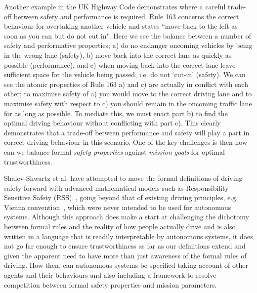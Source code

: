 \documentclass[sigconf]{acmart}
\begin{document}
Another example in the UK Highway Code demonstrates where a careful trade-off between safety and performance is required. 
%
Rule 163 concerns the correct behaviour for overtaking another vehicle and states ``move back to the left as soon as you can but do not cut in". 
%
Here we see the balance between a number of safety and performative properties; a) do no endanger oncoming vehicles by being in the wrong lane (safety), b) move back into the correct lane as quickly as possible (performance), and c) when moving back into the correct lane leave sufficient space for the vehicle being passed, i.e. do not `cut-in' (safety). 
%
We can see the atomic properties of Rule 163 a) and c) are actually in conflict with each other; 
%
to maximise safety of a) you would move to the correct driving lane and to maximise safety with respect to c) you should remain in the oncoming traffic lane for as long as possible. 
%
To mediate this, we must enact part b) to find the optimal driving behaviour without conflicting with part c). 
%
This clearly demonstrates that a trade-off between performance and safety will play a part in correct driving behaviour in this scenario. 
%
One of the key challenges is then how can we balance formal \emph{safety properties} against \emph{mission goals} for optimal trustworthiness. 

%
Shalev-Shwartz et al. have attempted to move the formal definitions of driving safety forward with advanced mathematical models such as Responsibility-Sensitive Safety (RSS)~\cite{shalevshwartz2018formal}, going beyond that of existing driving principles, e.g. Vienna convention~\cite{vienna}, which were never intended to be used for autonomous systems. Although this approach does make a start at challenging the dichotomy between formal rules and the reality of how people actually drive and is also written in a language that is readily interpretable by autonomous systems, it does not go far enough to ensure trustworthiness as far as our definitions extend and given the apparent need to have more than just awareness of the formal rules of driving. 
%
How then, can autonomous systems be specified taking account of other agents and their behaviours and also including a framework to resolve competition between formal safety properties and mission parameters. 
\end{document}
